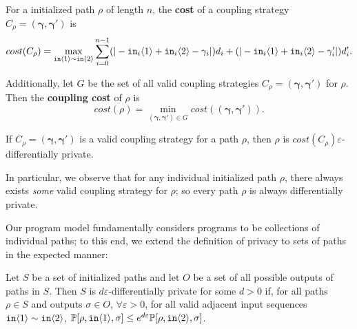 \begin{defn}
    For a initialized path $\rho$ of length $n$, the \textbf{cost} of a coupling strategy $C_\rho=(\bm{\gamma}, \bm{\gamma}')$ is \[cost(C_\rho) = \max_{\texttt{in}\langle1 \rangle\sim\texttt{in}\langle2 \rangle}\sum_{i=0}^{n-1}(|-\texttt{in}_i\langle1 \rangle+\texttt{in}_i\langle2 \rangle-\gamma_i|)d_i+(|-\texttt{in}_i\langle1 \rangle+\texttt{in}_i\langle2 \rangle-\gamma_i'|)d_i'.\]

    Additionally, let $G$ be the set of all valid coupling strategies $C_\rho=(\bm{\gamma}, \bm{\gamma}')$ for $\rho$. Then the \textbf{coupling cost} of $\rho$ is 
    \[cost(\rho) = \min_{(\bm{\gamma}, \bm{\gamma}')\in G}cost((\bm{\gamma}, \bm{\gamma}')).\]
\end{defn}

\begin{cor}
    If $C_\rho=(\bm{\gamma}, \bm{\gamma}')$ is a valid coupling strategy for a path $\rho$, then $\rho$ is $cost(C_\rho)\varepsilon$-differentially private.
\end{cor}

In particular, we observe that for any individual initialized path $\rho$, there always exists \textit{some} valid coupling strategy for $\rho$; so every path $\rho$ is always differentially private. 

Our program model fundamentally considers programs to be collections of individual paths; to this end, we extend the definition of privacy to sets of paths in the expected manner:

\begin{defn}
  Let $S$ be a set of initialized paths and let $O$ be a set of all possible outputs of paths in $S$. 
  Then $S$ is $d\varepsilon$-differentially private for some $d>0$ if, for all paths $\rho\in S$ and outputs $\sigma\in O$, $\forall \varepsilon>0$, for all valid adjacent input sequences $\texttt{in}\langle1 \rangle\sim \texttt{in}\langle2 \rangle$, $\mathbb{P}[\rho, \texttt{in}\langle1 \rangle, \sigma]\leq e^{d\varepsilon}\mathbb{P}[\rho, \texttt{in}\langle2 \rangle, \sigma]$.
\end{defn}



